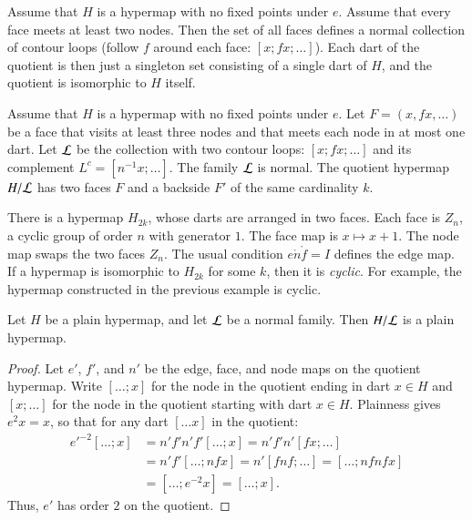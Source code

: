 \begin{example}\label{ex:Hall} 
Assume that $H$ is a hypermap with no fixed points under $e$. Assume that every face meets at least two nodes. Then the set of all faces defines a normal collection of contour loops (follow $f$ around each face: $[x;f x;\ldots]$).  Each dart of the quotient is then just a singleton set consisting of a single dart of $H$, and the quotient is isomorphic to $H$ itself.
\end{example}

\begin{example}\label{ex:H2} 
Assume that $H$ is a hypermap with no fixed points
under $e$.  Let $F = (x,f x,\ldots)$ be a face 
that visits at least
three nodes and that meets each node in at most one dart.
Let $\cal L$ be the
collection with two contour loops:  $[x;f x;\ldots]$ and its
complement $L^c = [n^{-1} x;\ldots]$.
The family $\cal L$ is normal. The quotient hypermap $H/{\cal L}$ has two faces $F$ and a backside $F'$ of the same cardinality $k$.
\end{example}





\begin{example}[cyclic]\label{ex:H2k} 
There is a hypermap $H_{2k}$, whose darts are arranged in two faces.  Each
face is $Z_n$, a cyclic group of order $n$ with generator $1$.
The face map is $x\mapsto x+1$.
The node map swaps the two faces $Z_n$.
The usual condition $e\ocirc n\ocirc f = I$ defines the edge map.
If a hypermap is isomorphic to $H_{2k}$ for
some $k$, then it is {\it cyclic}.  For example,
the hypermap constructed in the previous example is cyclic.
\end{example}

\begin{lemma}
Let $H$ be a plain hypermap, and let $\cal L$ be a
normal family.  Then $H/{\cal L}$ is a plain hypermap.
\end{lemma}

\begin{proof} Let $e'$, $f'$, and $n'$ be the edge, face, and node maps on the
quotient hypermap.  Write $[\ldots; x]$ for the node in the quotient
ending in dart $x\in H$ and $[x;\ldots]$ for the node in the quotient
starting with dart $x\in H$.  Plainness gives $e^2 x = x$, so that for any
dart $[\ldots x]$ in the quotient:
    $$\begin{array}{lll}
    {e'}^{-2} [\ldots; x] &= n' f' n' f' [\ldots; x] = n' f' n' [f x; \ldots] \\&=
    n' f' [\ldots; n f x] = n' [f n f; \ldots] = [\ldots; n f n f x]\\ &=
    [\ldots; e^{-2} x] = [\ldots; x].
    \end{array}$$
Thus, $e'$ has order $2$ on the quotient.
\end{proof}

